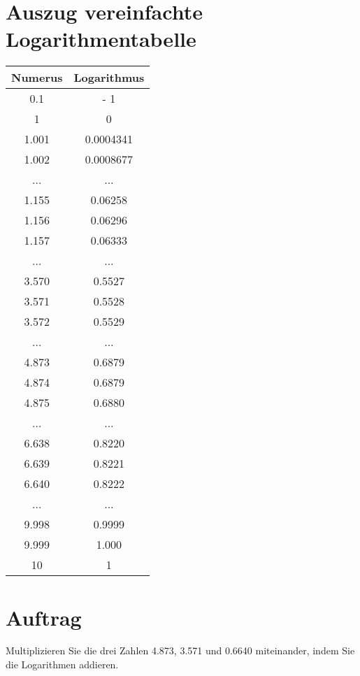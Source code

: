 




\renewcommand{\metaHeaderLine}{Logarithmen}
\renewcommand{\arbeitsblattTitel}{Multiplikation durch Addition}

\arbeitsblattHeader{}

\section*{Auszug vereinfachte Logarithmentabelle}

\begin{tabular}{|c|c|}\hline
Numerus & Logarithmus\\\hline
0.1   & - 1      \\\hline
1     & 0        \\\hline
1.001 & 0.0004341\\
1.002 & 0.0008677\\
...   & ...      \\
1.155 & 0.06258  \\
1.156 & 0.06296  \\
1.157 & 0.06333  \\
...   & ...      \\
3.570 & 0.5527   \\
3.571 & 0.5528   \\
3.572 & 0.5529   \\
...   & ...      \\
4.873 & 0.6879   \\
4.874 & 0.6879   \\
4.875 & 0.6880   \\
...   & ...      \\
6.638 & 0.8220   \\
6.639 & 0.8221   \\
6.640 & 0.8222   \\
...   & ...      \\
9.998 & 0.9999   \\
9.999 & 1.000    \\\hline
10    & 1        \\\hline
\end{tabular}
 
\section*{Auftrag}
Multiplizieren Sie die drei Zahlen 4.873, 3.571 und 0.6640
miteinander, indem Sie die Logarithmen addieren.



